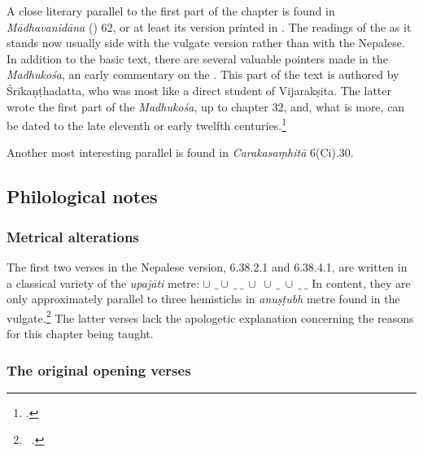     A close literary parallel to the first part of the chapter is found
in \emph{Mādhavanidāna} (\cite{madhava}) 62, or at least its version
printed in \citet[361]{madhava}. The readings of the \cite{madhava}
as it stands now usually side with the vulgate version rather than
with the Nepalese. In addition to the basic text, there are several
valuable pointers made in the \emph{Madhukośa}, an early commentary
on the \cite{madhava}. This part of the text is authored by
Śrīkaṇṭhadatta, who was most like a direct student of Vijarakṣita.
The latter wrote the first part of the \emph{Madhukośa}, up to
chapter 32, and, what is more, can be dated to the late eleventh or
early twelfth centuries.\footcite[22--26]{meul-1974}
    
    Another most interesting parallel is found in \emph{Carakasaṃhitā} 6(Ci).30.
    
    
    \subsection{Philological notes}
    
    \subsubsection{Metrical alterations}
    
The first two verses in the Nepalese version, 6.38.2.1 and 6.38.4.1, are
written in a classical variety of the \emph{upajāti} metre:
\underline{$\cup$} $\_ \cup\ \_\ \_\ \cup\ \cup\ \_\ \cup\ \_\ \_$ In
content, they are only approximately parallel to three hemistichs in
\emph{anuṣṭubh} metre found in the vulgate.\footnote{\SS\
    .} The latter verses lack the apologetic explanation
    concerning the reasons for this chapter being taught.
        
\subsubsection{The original opening verses}

